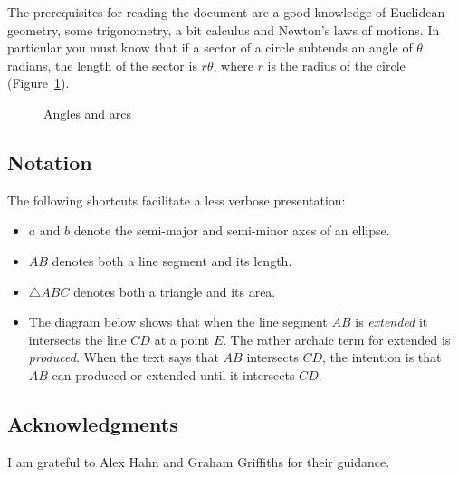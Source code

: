 The prerequisites for reading the document are a good knowledge of Euclidean geometry, some trigonometry, a bit calculus and Newton's laws of motions. In particular you must know that if a sector of a circle subtends an angle of $\theta$ radians, the length of the sector is $r\theta$, where $r$ is the radius of the circle (Figure~\ref{f.radians}).

\begin{figure}[t]
\begin{center}
\caption{Angles and arcs}\label{f.radians}
\end{center}
\end{figure}

\subsection*{Notation}

The following shortcuts facilitate a less verbose presentation:
\begin{itemize}
\item $a$ and $b$ denote the semi-major and semi-minor axes of an ellipse.
\item $AB$ denotes both a line segment and its length.
\item $\triangle ABC$ denotes both a triangle and its area.
\item The diagram below shows that when the line segment $AB$ is \emph{extended} it intersects the line $CD$ at a point $E$. The rather archaic term for extended is \emph{produced}. When the text says that $AB$ intersects $CD$, the intention is that $AB$ can produced or extended until it intersects $CD$.
\end{itemize}

\begin{center}
\end{center}

\subsection*{Acknowledgments}

I am grateful to Alex Hahn and Graham Griffiths for their guidance.
